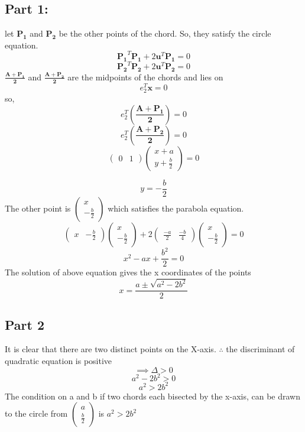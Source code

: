 \documentclass[10pt, a4paper]{article}
\newcommand{\myvec}[1]{\ensuremath{\begin{pmatrix}#1\end{pmatrix}}}
\let\vec\mathbf
\begin{document}
\subsection{Part 1:}
let $\vec{P_1}$ and $\vec{P_2}$ be the other points of the chord. So, they satisfy the circle equation.
\begin{equation}
    \vec{P_1}^T\vec{P_1} + 2\vec{u}^T\vec{P_1}  = 0
\end{equation}
\begin{equation}
     \vec{P_2}^T\vec{P_2} + 2\vec{u}^T\vec{P_2} = 0
\end{equation}
$\vec{\frac{A+P_1}{2}}$ and $\vec{\frac{A+P_2}{2}}$ are the midpoints of the chords and lies on 
\begin{equation}
    e_2^T\vec{x} = 0
\end{equation}
so,
\begin{equation}
    e_2^T(\vec{\frac{A+P_1}{2}}) = 0
\end{equation}
\begin{equation}
    e_2^T(\vec{\frac{A+P_2}{2}}) = 0
\end{equation}
\begin{equation}
    \myvec{0 & 1}\myvec{x+a \\ y+\frac{b}{2}} = 0
\end{equation}

\begin{equation}
    y = -\frac{b}{2}
\end{equation}
The other point is $\myvec{x\\ -\frac{b}{2}}$  which satisfies the parabola equation.
\begin{equation}
	\myvec{x & -\frac{b}{2}}\myvec{x \\ -\frac{b}{2}} +2\myvec{\frac{-a}{2} & \frac{-b}{4}}\myvec{x \\ -\frac{b}{2}}  = 0
\end{equation}
\begin{equation}
    x^2 - ax + \frac{b^2}{2} = 0
\end{equation}
The solution of above equation gives the x coordinates of the points
\begin{equation}
    x = \frac{a \pm \sqrt{a^2 - 2b^2}}{2}
\end{equation}
\subsection{Part 2}
It is clear that there are two distinct points on the X-axis.
$\therefore$ the discriminant of quadratic equation is positive\\
\begin{equation}
    \implies \Delta > 0
\end{equation}
\begin{equation}
    {a^2 - 2b^2} > 0
\end{equation}
\begin{equation}
a^2 > 2b^2
\end{equation}
The condition on a and b if two chords each bisected by the x-axis, can be drawn to the circle from $\myvec{a \\ \frac{b}{2}}$ is 
$a^2 > 2b^2$
\end{document}
